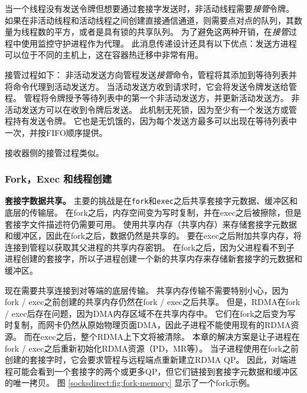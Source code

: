当一个线程没有发送令牌但想要通过套接字发送时，非活动线程需要\emph {接管}令牌。
如果在非活动线程和活动线程之间创建直接通信通道，则需要点对点的队列，其数量为线程数的平方，或者是具有锁的共享队列。
为了避免这两种开销，在\emph {接管}过程中使用监控守护进程作为代理。
此消息传递设计还具有以下优点：发送方进程可以位于不同的主机上，这在容器热迁移中非常有用。

接管过程如下：
非活动发送方向管程发送\emph {接管}命令，管程将其添加到等待列表并将命令代理到活动发送方。
当活动发送方收到请求时，它会将发送令牌发送给管程。
管程将令牌授予等待列表中的第一个非活动发送方，并更新活动发送方。
非活动发送方可以在收到令牌后发送。
此机制无死锁，因为至少有一个发送方或管程持有发送令牌。
它也是无饥饿的，因为每个发送方最多可以出现在等待列表中一次，并按FIFO顺序提供。

接收器侧的接管过程类似。



\subsubsection{Fork，Exec 和线程创建}
\label{socksdirect:subsubsec:fork_fork}


\textbf {套接字数据共享。}
主要的挑战是在\texttt {fork}和\texttt {exec}之后共享套接字元数据、缓冲区和底层的传输层。
在fork之后，内存空间变为写时复制，并在exec之后被擦除，但是套接字文件描述符仍需要可用。
\sys{} 使用共享内存（共享内存）来存储套接字元数据和缓冲区，因此在fork之后，数据仍然是共享的。
要在exec之后附加共享内存，\libipc {}将连接到管程以获取其父进程的共享内存密钥。
在fork之后，因为父进程看不到子进程创建的套接字，所以子进程创建一个新的共享内存来存储新套接字的元数据和缓冲区。

现在需要共享连接到对等端的底层传输。
共享内存传输不需要特别小心，因为fork / exec之前创建的共享内存仍然在fork / exec之后共享。
但是，RDMA在fork / exec后存在问题，因为DMA内存区域不在共享内存中。
它们在fork之后变为写时复制，而网卡仍然从原始物理页面DMA，因此子进程不能使用现有的RDMA资源。
而在exec之后，整个RDMA上下文将被清除。
本章的解决方案是让子进程在fork / exec之后重新初始化RDMA资源（PD，MR等）。
当子进程使用在fork之前创建的套接字时，它会要求管程与远程端点重新建立RDMA QP。
因此，对端进程可能会看到一个套接字的两个或更多QP，但它们链接到套接字元数据和缓冲区的唯一拷贝。
图 \ref {socksdirect:fig:fork-memory} 显示了一个fork示例。


